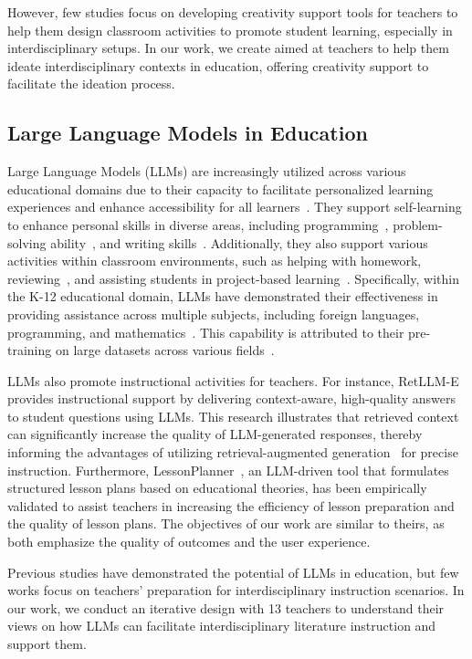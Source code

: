 However, few studies focus on developing creativity support tools for teachers to help them design classroom activities to promote student learning, especially in interdisciplinary setups. In our work, we create \name{} aimed at teachers to help them ideate interdisciplinary contexts in education, offering creativity support to facilitate the ideation process.

\subsection{Large Language Models in Education}
Large Language Models (LLMs) are increasingly utilized across various educational domains due to their capacity to facilitate personalized learning experiences and enhance accessibility for all learners~\cite{mogavi2024chatgpt}. 
They support self-learning to enhance personal skills in diverse areas, including programming~\cite{yilmaz2023augmented}, problem-solving ability~\cite{kasneci2023chatgpt}, and writing skills~\cite{shidiq2023use}. Additionally, they also support various activities within classroom environments, such as helping with homework, reviewing~\cite {mogavi2024chatgpt}, and assisting students in project-based learning~\cite{zheng2024charting}. 
Specifically, within the K-12 educational domain, LLMs have demonstrated their effectiveness in providing assistance across multiple subjects, including foreign languages, programming, and mathematics~\cite{mogavi2023exploring}. This capability is attributed to their pre-training on large datasets across various fields~\cite{NEURIPS2020_1457c0d6}.

LLMs also promote instructional activities for teachers. 
For instance, RetLLM-E~\cite{mitra2024retllm} provides instructional support by delivering context-aware, high-quality answers to student questions using LLMs. This research illustrates that retrieved context can significantly increase the quality of LLM-generated responses, thereby informing the advantages of 
utilizing retrieval-augmented generation~\cite{lewis2020retrieval} for precise instruction. 
Furthermore, LessonPlanner~\cite{fan2024lessonplanner}, an LLM-driven tool that formulates structured lesson plans based on educational theories, has been empirically validated to assist teachers in increasing the efficiency of lesson preparation and the quality of lesson plans. 
The objectives of our work are similar to theirs, as both emphasize the quality of outcomes and the user experience.

Previous studies have demonstrated the potential of LLMs in education, but few works focus on teachers' preparation for interdisciplinary instruction scenarios.
In our work, we conduct an iterative design with 13 teachers to understand their views on how LLMs can facilitate interdisciplinary literature instruction and support them.